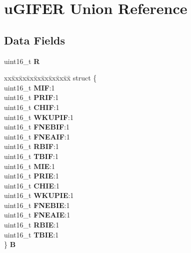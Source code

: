 \hypertarget{unionuGIFER}{}\section{u\+G\+I\+F\+ER Union Reference}
\label{unionuGIFER}
\subsection*{Data Fields}
\begin{DoxyCompactItemize}
\item 
\mbox{\label{unionuGIFER_a2d463df0b520e2d131f1cb3350e53440}} 
uint16\+\_\+t {\bfseries R}
\item 
\mbox{\label{unionuGIFER_a340d38f74a91b244cdba7be1d1a62614}} 
\begin{tabbing}
xx\=xx\=xx\=xx\=xx\=xx\=xx\=xx\=xx\=\kill
struct \{\\
\>uint16\_t {\bfseries MIF}:1\\
\>uint16\_t {\bfseries PRIF}:1\\
\>uint16\_t {\bfseries CHIF}:1\\
\>uint16\_t {\bfseries WKUPIF}:1\\
\>uint16\_t {\bfseries FNEBIF}:1\\
\>uint16\_t {\bfseries FNEAIF}:1\\
\>uint16\_t {\bfseries RBIF}:1\\
\>uint16\_t {\bfseries TBIF}:1\\
\>uint16\_t {\bfseries MIE}:1\\
\>uint16\_t {\bfseries PRIE}:1\\
\>uint16\_t {\bfseries CHIE}:1\\
\>uint16\_t {\bfseries WKUPIE}:1\\
\>uint16\_t {\bfseries FNEBIE}:1\\
\>uint16\_t {\bfseries FNEAIE}:1\\
\>uint16\_t {\bfseries RBIE}:1\\
\>uint16\_t {\bfseries TBIE}:1\\
\} {\bfseries B}\\


\end{tabbing}
\end{DoxyCompactItemize}
